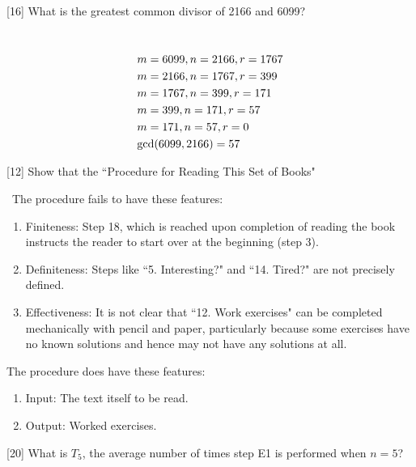 \documentclass{amsart}
\begin{document}
\begin{problem}{[}16{]}
  What is the greatest common divisor of 2166 and 6099?
\end{problem}

\begin{solution}
\
\begin{align*}
  &m = 6099, n = 2166, r = 1767 \\
  &m = 2166, n = 1767, r = 399 \\
  &m = 1767, n = 399, r = 171 \\
  &m = 399, n = 171, r = 57 \\
  &m = 171, n = 57, r = 0 \\
  &\textup{gcd}(6099, 2166) = 57
\end{align*}
\end{solution}

\begin{problem}{[}12{]}
  Show that the ``Procedure for Reading This Set of Books"
\end{problem}

\begin{solution}
\
The procedure fails to have these features:
\begin{enumerate}
  \item Finiteness: Step 18, which is reached upon completion of reading the
    book instructs the reader to start over at the beginning (step 3).
  \item Definiteness: Steps like ``5. Interesting?" and ``14. Tired?"
    are not precisely defined.
  \item Effectiveness: It is not clear that ``12. Work exercises" can be
    completed mechanically with pencil and paper, particularly because some
    exercises have no known solutions and hence may not have any solutions at
    all.
\end{enumerate}
The procedure does have these features:
\begin{enumerate}
  \item Input: The text itself to be read.
  \item Output: Worked exercises.
\end{enumerate}
\end{solution}

\begin{problem}{[}20{]}
  What is \(T_5\), the average number of times step E1 is performed when
  \(n = 5\)?
\end{problem}
\end{document}
